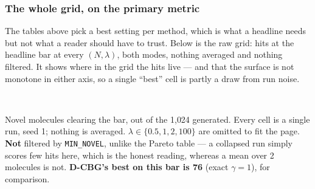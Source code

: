 \documentclass[11pt]{article}
\begin{document}
\subsubsection{The whole grid, on the primary metric}

The tables above pick a best setting per method, which is what a headline needs
but not what a reader should have to trust. Below is the raw grid: hits at the
headline bar at every $(N, \lambda)$, both modes, nothing averaged and nothing
filtered. It shows where in the grid the hits live --- and that the surface is
not monotone in either axis, so a single ``best'' cell is partly a draw from run
noise.

\begin{table}[htbp]
\centering
\scriptsize
\setlength{\tabcolsep}{3.5pt}
\\[0.4em] \begin{minipage}{0.92\textwidth}\footnotesize Novel molecules clearing the bar, out of the 1{,}024 generated. Every cell is a single run, seed 1; nothing is averaged. $\lambda \in \{0.5, 1, 2, 100\}$ are omitted to fit the page. \textbf{Not} filtered by \texttt{MIN\_NOVEL}, unlike the Pareto table --- a collapsed run simply scores few hits here, which is the honest reading, whereas a mean over 2 molecules is not. \textbf{D-CBG's best on this bar is 76} (exact $\gamma=1$), for comparison.\end{minipage}
\caption{MDLM: hits at ring count $\geq 5$ across the whole $(N, \lambda)$ grid. Columns are (mixture mode) $\times$ $\lambda$.}
\label{tab:hits-grid-ring_count-MDLM}
\end{table}
\end{document}
